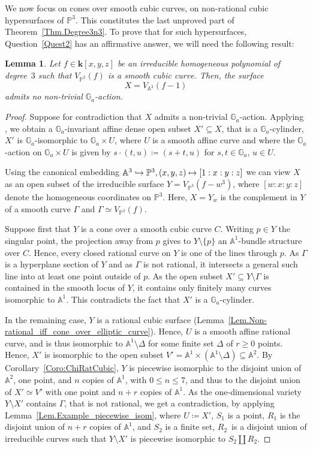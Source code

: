 \documentclass[JEP,XML,SOM,Unicode,NoFloatCountersInSection,published]{cedram}
\newcommand\mto{\mathchoice{\longmapsto}{\mapsto}{\mapsto}{\mapsto}}
\newtheorem{lemma}{Lemma}[section]
\theoremstyle{definition}
\newcommand\A{{\mathbb A}}\let\AA\A
\renewcommand\k{{\mathbf k}}
\newcommand\p{{\mathbb P}}\let\PP\p
\newcommand\GG{{\mathbb G}}
\begin{document}
We now focus on cones over smooth cubic curves, \ie on non-rational cubic hyper\-surfaces of $\PP^3$. This constitutes the last unproved part of Theorem~\ref{Thm.Degree3n3}. To prove that for such hypersurfaces, Question~\eqref{Quest2} has an affirmative answer, we will need the following result:

\begin{lemma}\label{Lem:Gafminus1}
Let $f\in \k[x,y,z]$ be an irreducible homogeneous polynomial of degree~$3$ such that $V_{\PP^2}(f)$ is a smooth cubic curve. Then, the surface
\[X=V_{\A^3}(f-1)\]
admits no non-trivial $\GG_a$-action.
\end{lemma}
\begin{proof}
Suppose for contradiction that $X$ admits a non-trivial $\GG_a$-action.
Applying \cite[Prop.\,2.5.1]{BlFaTe2023Connected-Algebrai},
we obtain a $\GG_a$-invariant affine dense open subset $X'\subseteq X$, that is a $\GG_a$-cylinder, \ie $X'$ is $\GG_a$-isomorphic to $\GG_a\times U$, where $U$ is a smooth affine curve and where the $\GG_a$-action
on $\GG_a \times U$ is given by
$s \cdot (t, u) \coloneqq (s+t, u)$ for $s, t \in \GG_a$, $u \in U$.

Using the canonical embedding $\A^3\hookrightarrow \p^3, (x,y,z)\mto [1:x:y:z]$ we
can view $X$ as an open subset of the irreducible surface $Y=V_{\p^3}(f-w^3)$,
where $[w:x:y:z]$ denote the homogeneous coordinates on $\PP^3$.
Here, $X=Y_w$ is the complement in $Y$ of a smooth curve $\Gamma$
and $\Gamma \simeq V_{\PP^2}(f)$.

Suppose first that $Y$ is a cone over a smooth cubic curve $C$.
Writing $p\in Y$ the singular point, the projection away from $p$ gives to $Y\setminus \{p\}$ an $\A^1$-bundle structure over $C$. Hence, every closed rational curve on $Y$ is one of the lines through $p$. As $\Gamma$ is a hyperplane section of $Y$ and as $\Gamma$ is not rational,
it intersects a general such line into at least one point outside of $p$. As the
open subset $X'\subseteq Y\setminus \Gamma$ is contained in the smooth locus of $Y$,
it contains only finitely many curves isomorphic to $\A^1$. This contradicts the fact that $X'$ is a $\GG_a$-cylinder.

In the remaining case, $Y$ is a rational cubic surface (Lemma~\ref{Lem.Non-rational_iff_cone_over_elliptic_curve}). Hence, $U$ is a smooth affine rational curve, and is thus isomorphic to $\A^1\setminus \Delta$ for some finite set $\Delta$ of $r\ge 0$ points. Hence, $X'$ is isomorphic to the open subset
$V'=\A^1\times (\A^1\setminus \Delta)\subseteq \A^2$. By Corollary~\ref{Coro:ChiRatCubic}, $Y$ is piecewise isomorphic to the disjoint union of $\A^2$, one point, and $n$ copies of $\A^1$, with
$0 \leq n \leq 7$, and thus to the disjoint union of $X' \simeq V'$
with one point and $n+r$ copies of $\A^1$. As the
one-dimensional variety $Y \setminus X'$ contains $\Gamma$, that is not rational,
we get a contradiction, by applying Lemma~\ref{Lem.Example_piecewise_isom},
where $U \coloneqq X'$,
$S_1$ is a point, $R_1$ is the disjoint union of $n+r$ copies of $\AA^1$,
and $S_2$ is a finite set, $R_2$~is a disjoint union of irreducible
curves such that $Y \setminus X'$ is piecewise isomorphic to $S_2 \amalg R_2$.
\end{proof}
\end{document}
